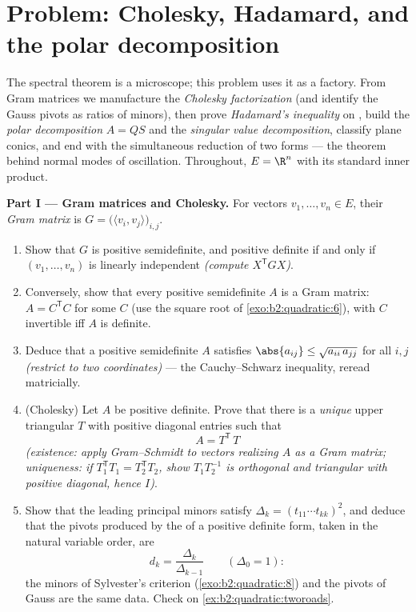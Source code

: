 \section{Problem: Cholesky, Hadamard, and the polar
decomposition}

\begin{problem}\label{pb:b2:quadratic:1}
The spectral theorem is a microscope; this problem uses it as a
factory. From Gram matrices we manufacture the \emph{Cholesky
factorization} (and identify the
Gauss pivots as ratios of minors), then prove \emph{Hadamard's
inequality} on , build
the \emph{polar decomposition} $A =
QS$ and the \emph{singular value decomposition}, classify plane
conics, and end with the simultaneous reduction of two forms ---
the theorem behind normal modes of oscillation. Throughout, $E =
\R^n$ with its standard inner product.

\medskip
\noindent\textbf{Part I --- Gram matrices and Cholesky.} For
vectors $v_1, \dots, v_n \in E$, their \emph{Gram matrix} is
$G = \bigl(\langle v_i, v_j\rangle\bigr)_{i,j}$.
\begin{enumerate}
  \item Show that $G$ is  positive semidefinite, and
        positive definite if and only if $(v_1, \dots, v_n)$ is
        linearly independent \emph{(compute $X^{\mathsf T}GX$)}.
  \item Conversely, show that every  positive
        semidefinite $A$ is a Gram matrix: $A = C^{\mathsf T}C$
        for some $C$ (use the square root of
        \cref{exo:b2:quadratic:6}), with $C$ invertible iff $A$
        is definite.
  \item Deduce that a positive semidefinite $A$ satisfies
        $\abs{a_{ij}} \leq \sqrt{a_{ii}\,a_{jj}}$ for all $i,
        j$ \emph{(restrict to two coordinates)} --- the
        Cauchy--Schwarz inequality, reread matricially.
  \item (Cholesky) Let $A$ be positive definite. Prove that
        there is a \emph{unique} upper triangular $T$ with
        positive diagonal entries such that
        \[
        A = T^{\mathsf T}\,T
        \]
        \emph{(existence: apply Gram--Schmidt to vectors
        realizing $A$ as a Gram matrix; uniqueness: if
        $T_1^{\mathsf T}T_1 = T_2^{\mathsf T}T_2$, show
        $T_1T_2^{-1}$ is orthogonal and triangular with
        positive diagonal, hence $I$)}.
  \item Show that the leading principal minors satisfy
        $\Delta_k = (t_{11}\cdots t_{kk})^2$, and deduce that
        the pivots produced by the  of a
        positive definite form, taken in the natural variable
        order, are
        \[
        d_k = \frac{\Delta_k}{\Delta_{k-1}}
        \qquad (\Delta_0 = 1) :
        \]
        the minors of Sylvester's criterion
        (\cref{exo:b2:quadratic:8}) and the pivots of Gauss are
        the same data. Check on
        \cref{ex:b2:quadratic:tworoads}.
\end{enumerate}


\end{problem}
